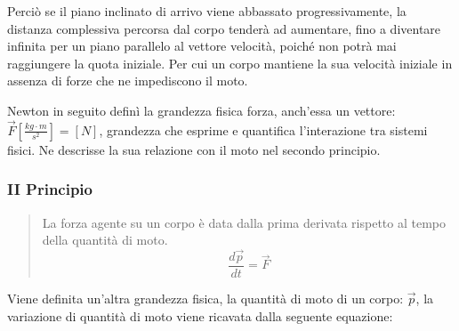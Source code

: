 \documentclass{article}
\numberwithin{equation}{subsection}
\begin{document}
Perciò se il piano inclinato di arrivo viene abbassato 
progressivamente, la distanza complessiva percorsa dal corpo tenderà ad 
aumentare, fino a diventare infinita per un piano parallelo al 
vettore velocità, poiché non potrà mai raggiungere la quota iniziale. 
Per cui un corpo mantiene la sua velocità iniziale 
in assenza di forze che ne impediscono il moto.

\begin{center}\end{center}
    
Newton in seguito definì la grandezza fisica forza, anch'essa un 
vettore: $\vec{F}\left[\displaystyle
\frac{kg\cdot m}{s^{2}}\right]=\left[N\right]$, grandezza che esprime e quantifica l'interazione tra sistemi fisici. Ne descrisse 
la sua relazione con il moto nel secondo principio.

\subsubsection{II Principio}
\begin{quotation}
    La forza agente su un corpo è data dalla prima derivata 
    rispetto al tempo della quantità di moto. 
    \begin{equation}
        \displaystyle\frac{d\vec{p}}{dt}=\vec{F}
    \end{equation}
\end{quotation}
Viene definita un'altra grandezza fisica, la quantità di moto 
di un corpo: $\vec{p}$, la variazione di quantità di moto 
viene ricavata dalla seguente equazione:
\end{document}
